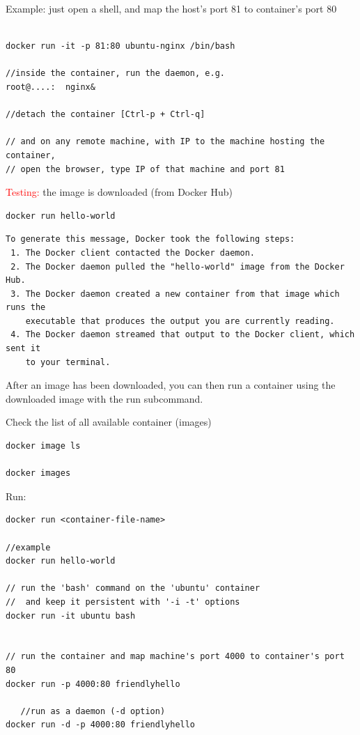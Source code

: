 Example: just open a shell, and map the host's port 81 to container's port 80
\begin{verbatim}

docker run -it -p 81:80 ubuntu-nginx /bin/bash

//inside the container, run the daemon, e.g.
root@....:  nginx&

//detach the container [Ctrl-p + Ctrl-q]

// and on any remote machine, with IP to the machine hosting the container,
// open the browser, type IP of that machine and port 81 

\end{verbatim}

\textcolor{red}{Testing:} the image is downloaded (from Docker Hub)
\begin{verbatim}
docker run hello-world
\end{verbatim}


\begin{verbatim}
To generate this message, Docker took the following steps:
 1. The Docker client contacted the Docker daemon.
 2. The Docker daemon pulled the "hello-world" image from the Docker Hub.
 3. The Docker daemon created a new container from that image which runs the
    executable that produces the output you are currently reading.
 4. The Docker daemon streamed that output to the Docker client, which sent it
    to your terminal.
\end{verbatim}

After an image has been downloaded, you can then run a container using the
downloaded image with the run subcommand.


Check the list of all available container (images)
\begin{verbatim}
docker image ls

docker images
\end{verbatim}


Run:
\begin{verbatim}
docker run <container-file-name>

//example
docker run hello-world

// run the 'bash' command on the 'ubuntu' container 
//  and keep it persistent with '-i -t' options
docker run -it ubuntu bash


// run the container and map machine's port 4000 to container's port 80
docker run -p 4000:80 friendlyhello
 
   //run as a daemon (-d option)
docker run -d -p 4000:80 friendlyhello 
\end{verbatim}

